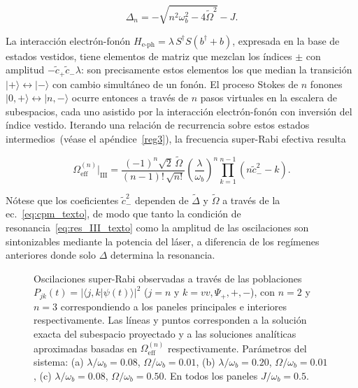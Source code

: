 \begin{equation}
	\Delta_n = -\sqrt{n^2\omega_b^2 - 4\widetilde\Omega^2} - J.
	\label{eq:res_III_texto}
\end{equation}

La interacción electrón-fonón $H_\mathrm{e\text{-}ph} = \lambda\,S^\dagger S(b^\dagger + b)$, expresada en la base de estados vestidos, tiene elementos de matriz que mezclan los índices $\pm$ con amplitud $-\tilde{c}_+\tilde{c}_-\lambda$: son precisamente estos elementos los que median la transición $|+\rangle \leftrightarrow |-\rangle$ con cambio simultáneo de un fonón. El proceso Stokes de $n$ fonones $|0,+\rangle \leftrightarrow |n,-\rangle$ ocurre entonces a través de $n$ pasos virtuales en la escalera de subespacios, cada uno asistido por la interacción electrón-fonón con inversión del índice vestido. Iterando una relación de recurrencia sobre estos estados intermedios~(véase el apéndice~\ref{reg3}), la frecuencia super-Rabi efectiva resulta

\begin{equation}
	\Omega_\mathrm{eff}^{(n)}\Big|_\mathrm{III}
	= \frac{(-1)^n\sqrt{2}\,\widetilde\Omega}{(n-1)!\,\sqrt{n!}}
	\left(\frac{\lambda}{\omega_b}\right)^{\!n}
	\prod_{k=1}^{n-1}\!\left(n\tilde{c}_-^2 - k\right).
	\label{eq:Oeff_III_texto}
\end{equation}

Nótese que los coeficientes $\tilde{c}_-^2$ dependen de $\widetilde\Delta$ y $\widetilde\Omega$ a través de la ec.~\eqref{eq:cpm_texto}, de modo que tanto la condición de resonancia~\eqref{eq:res_III_texto} como la amplitud de las oscilaciones son sintonizables mediante la potencia del láser, a diferencia de los regímenes anteriores donde solo $\Delta$ determina la resonancia.

\begin{figure}[H]
	\centering
	
	\caption{Oscilaciones super-Rabi observadas a través de las poblaciones $P_{jk}(t) = |\langle j,k|\psi(t)\rangle|^2$ ($j = n$ y $k = vv, \Psi_+, +, -$), con $n=2$ y $n=3$ correspondiendo a los paneles principales e interiores respectivamente. Las líneas y puntos corresponden a la solución exacta del subespacio proyectado y a las soluciones analíticas aproximadas basadas en $\Omega_\mathrm{eff}^{(n)}$ respectivamente. Parámetros del sistema: (a) $\lambda/\omega_b = 0.08$, $\Omega/\omega_b = 0.01$, (b) $\lambda/\omega_b = 0.20$, $\Omega/\omega_b = 0.01$, (c) $\lambda/\omega_b = 0.08$, $\Omega/\omega_b = 0.50$. En todos los paneles $J/\omega_b = 0.5$.}
	\label{fig:rabi_all_regimes}
\end{figure}

